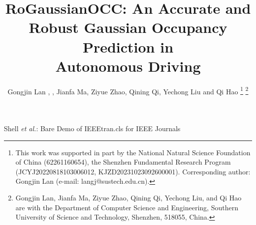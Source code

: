 \documentclass[journal]{IEEEtran}
\begin{document}
\title{
RoGaussianOCC: An Accurate and Robust Gaussian Occupancy Prediction in\\ Autonomous Driving
}

\author{Gongjin Lan\hspace{-1mm} \Envelope\orcidA{}\hspace{-1mm}, , Jianfa Ma, Ziyue Zhao, Qining Qi, Yechong Liu and Qi Hao\hspace{-1mm} \orcidB{}\hspace{-1mm}
\thanks{This work was supported in part by the National Natural Science Foundation of China (62261160654), the Shenzhen Fundamental Research Program (JCYJ20220818103006012, KJZD20231023092600001).
Corresponding author: Gongjin Lan (e-mail: langj@sustech.edu.cn).
}
\thanks{
Gongjin Lan, Jianfa Ma, Ziyue Zhao, Qining Qi, Yechong Liu, and Qi Hao are with the Department of Computer Science and Engineering, Southern University of Science and Technology, Shenzhen, 518055, China.}
}

%
{Shell \MakeLowercase{\textit{et al.}}: Bare Demo of IEEEtran.cls for IEEE Journals}


\maketitle
\end{document}
